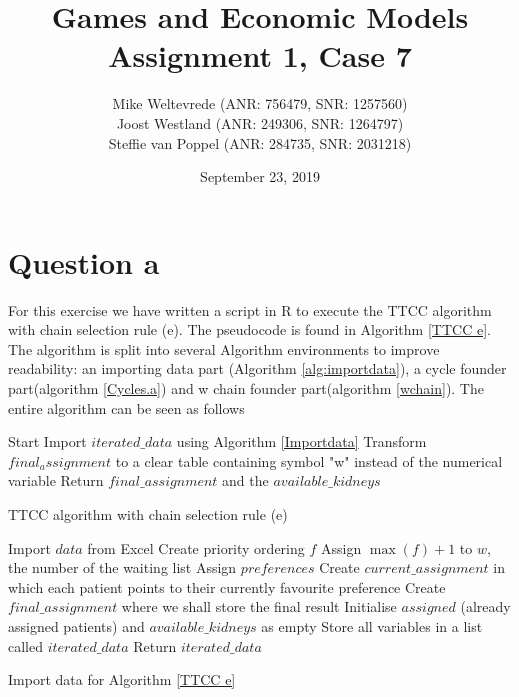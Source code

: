 \documentclass{article}
\title{Games and Economic Models \\ Assignment 1, Case 7}
\author{Mike Weltevrede (ANR: 756479, SNR: 1257560)\\Joost Westland (ANR: 249306, SNR: 1264797)\\Steffie van Poppel (ANR: 284735, SNR: 2031218)}
\date{September 23, 2019}
\begin{document}
\maketitle
\tableofcontents
\listoftodos


\newpage
\section{Question a}
For this exercise we have written a script in R to execute the TTCC algorithm with chain selection rule (e). The pseudocode is found in Algorithm \ref{TTCC e}. The algorithm is split into several Algorithm environments to improve readability: an importing data part (Algorithm \ref{alg:importdata}), a cycle founder part(algorithm \ref{Cycles.a}) and w chain founder part(algorithm \ref{wchain}). The entire algorithm can be seen as follows\\

\begin{algorithm}[H]{
    Start\;
    Import $iterated\_data$ using Algorithm \ref{Importdata}
    \BlankLine
    Transform $final_assignment$ to a clear table containing symbol "w" instead of the numerical variable\;
    Return $final\_assignment$ and the $available\_kidneys$\;
    }
\caption{TTCC algorithm with chain selection rule (e)  \label{TTCC e}}
\end{algorithm}

\begin{algorithm}[H]{
    Import $data$ from Excel\;
    Create priority ordering $f$\;
    Assign $\max(f)+1$ to $w$, the number of the waiting list\;
    Assign $preferences$\;
    Create $current\_assignment$ in which each patient points to their currently favourite preference\;
    Create $final\_assignment$ where we shall store the final result\;
    Initialise $assigned$ (already assigned patients) and $available\_kidneys$ as empty\;
    Store all variables in a list called $iterated\_data$\;
    Return $iterated\_data$\;
    }
    \caption{Import data for Algorithm \ref{TTCC e} \label{alg:importdata}}
\end{algorithm}
\end{document}
